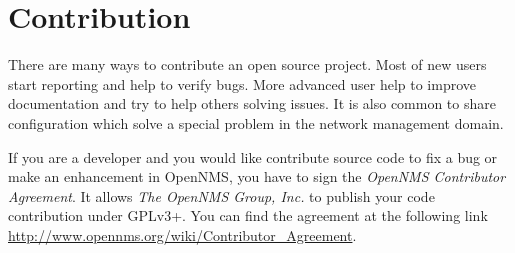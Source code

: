\section{Contribution}
There are many ways to contribute an open source project. Most of new users start reporting and help to verify bugs. More advanced user help to improve documentation and try to help others solving issues. It is also common to share configuration which solve a special problem in the network management domain.

If you are a developer and you would like contribute source code to fix a bug or make an enhancement in OpenNMS, you have to sign the \emph{OpenNMS Contributor Agreement}. It allows \textit{The OpenNMS Group, Inc.} to publish your code contribution under GPLv3+. You can find the agreement at the following link \url{http://www.opennms.org/wiki/Contributor_Agreement}. 

